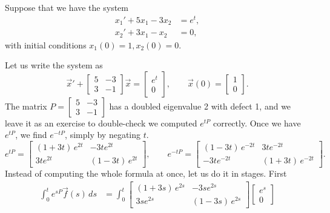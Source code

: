 \begin{example}
Suppose that we have the system
\begin{align*}
x_1' + 5x_1 - 3x_2 &= e^t , \\
x_2' + 3x_1 - x_2 &= 0 ,
\end{align*}
with initial conditions $x_1(0) = 1, x_2(0) = 0$.

Let us write the system as
\begin{equation*}
{\vec{x}}' +
\begin{bmatrix} 5 & -3 \\ 3 & -1 \end{bmatrix}
\vec{x} =
\begin{bmatrix} e^t \\ 0 \end{bmatrix} ,
\qquad
\vec{x}(0) = 
\begin{bmatrix} 1 \\ 0 \end{bmatrix} .
\end{equation*}
The matrix
$P = \left[
\begin{smallmatrix} 5 & -3 \\ 3 & -1 \end{smallmatrix} \right]$
has a doubled eigenvalue 2 with defect 1, and we leave it as an exercise
to double-check we computed $e^{tP}$ correctly.  Once we have
$e^{tP}$, we find $e^{-tP}$, simply by negating $t$.
\begin{equation*}
e^{tP} = 
\begin{bmatrix}
(1+3t)\,e^{2t} & -3te^{2t} \\
3te^{2t} & (1-3t)\,e^{2t}
\end{bmatrix}
, \qquad
e^{-tP} = 
\begin{bmatrix}
(1-3t)\,e^{-2t} & 3te^{-2t} \\
-3te^{-2t} & (1+3t)\,e^{-2t}
\end{bmatrix}
.
\end{equation*}
Instead of computing the whole formula at once, let us do it in stages.
First
\begin{equation*}
\begin{split}
\int_0^t e^{sP}\vec{f}(s) \, ds & = 
\int_0^t
 \begin{bmatrix}
 (1+3s)\,e^{2s} & -3se^{2s} \\
 3se^{2s} & (1-3s)\,e^{2s}
 \end{bmatrix}
 \begin{bmatrix} e^{s} \\ 0 \end{bmatrix}

\end{split}
\end{equation*}
\end{example}
